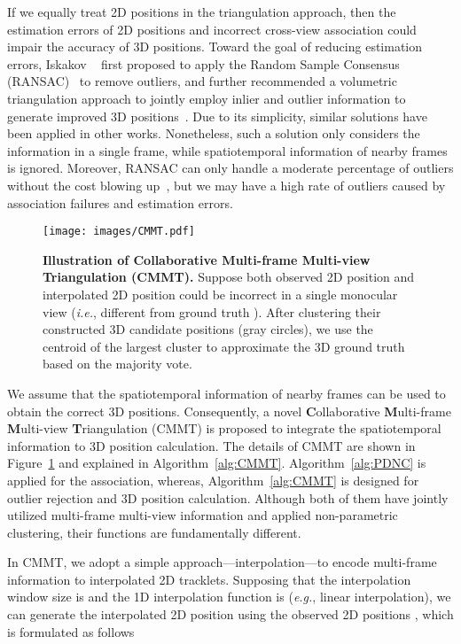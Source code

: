 \documentclass{CVM}
\newcommand{\ie}{{\it i.e.}}
\newcommand{\eg}{{\it e.g.}}
\begin{document}
If we equally treat 2D positions in the triangulation approach, then the
estimation errors of 2D positions and incorrect cross-view association could impair the accuracy of 3D positions. Toward the goal of reducing estimation errors, Iskakov \etal~ first proposed to apply the Random Sample Consensus (RANSAC)~\cite{fischler1981random} 
to remove outliers, and further recommended a volumetric triangulation approach to jointly employ inlier and outlier information to generate improved 3D positions~\cite{iskakov2019learnable}. Due to its simplicity, similar solutions have been applied in other works. Nonetheless, such a solution only considers the information in a single frame, while spatiotemporal information of nearby frames is ignored. Moreover, RANSAC can only handle a moderate percentage of outliers without the cost blowing up~\cite{lowe2004distinctive}, but we may have a high rate of outliers caused by association failures and estimation errors.





\begin{figure}[!h]
  \centering
  \texttt{[image: images/CMMT.pdf]}
  \caption{\textbf{Illustration of \textbf{C}ollaborative \textbf{M}ulti-frame \textbf{M}ulti-view \textbf{T}riangulation (CMMT).} Suppose both observed 2D position  and interpolated 2D position  could be incorrect in a single monocular view (\ie, different from ground truth ). After clustering their constructed 3D candidate positions (gray circles), we use the centroid of the largest cluster to approximate the 3D ground truth  based on the majority vote. 
  }\label{fig:CMMT}
\end{figure}

We assume that the spatiotemporal information of nearby frames can be used to obtain the correct 3D positions. Consequently, a novel \textbf{C}ollaborative \textbf{M}ulti-frame \textbf{M}ulti-view \textbf{T}riangulation (CMMT) is proposed to integrate the spatiotemporal information to 3D position calculation.  The details of CMMT are shown in Figure~\ref{fig:CMMT} and explained in Algorithm~\ref{alg:CMMT}. Algorithm~\ref{alg:PDNC} is applied for the association, whereas, Algorithm~\ref{alg:CMMT} is designed for outlier rejection and 3D position calculation. Although both of them have jointly utilized multi-frame multi-view information and applied non-parametric clustering, their functions are fundamentally different.




In CMMT, we adopt a simple approach---interpolation---to encode multi-frame information to interpolated 2D tracklets. Supposing that the interpolation window size is  and the 1D interpolation function is  (\eg, linear interpolation), we can generate the interpolated 2D position  using the observed 2D positions , which is formulated as follows
\end{document}
